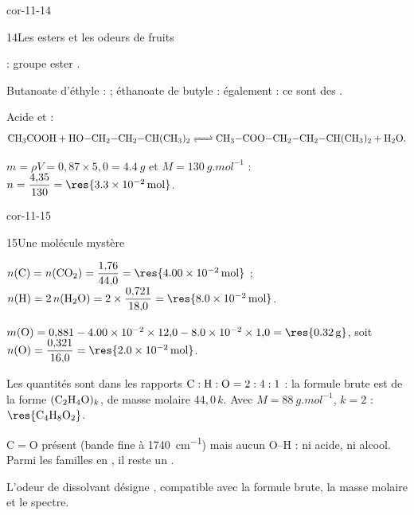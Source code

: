\begin{blocLivre}{cor-11-14}
\begin{corrige}{14}{Les esters et les odeurs de fruits}
\begin{questions}
\item {}\; : groupe ester .
\item Butanoate d'éthyle :  ; éthanoate de butyle  : 
également : ce sont des .
\item Acide  et  :
\[\ce{CH3COOH + HO-CH2-CH2-CH(CH3)2 <=> CH3-COO-CH2-CH2-CH(CH3)2 + H2O}.\]
\item $m=\rho V=0{,}87\times5{,}0=\qty{4,4}{g}$ et $M=\qty{130}{g.mol^{-1}}$ :
$n=\dfrac{4{,}35}{130}=\res{\qty{3,3e-2}{mol}}$.
\end{questions}
\end{corrige}
\end{blocLivre}
\begin{blocLivre}{cor-11-15}
\begin{corrige}{15}{Une molécule mystère}
\begin{questions}
\item $n(\ce{C})=n(\ce{CO2})=\dfrac{1{,}76}{44{,}0}=\res{\qty{4,00e-2}{mol}}$ ;
$n(\ce{H})=2\,n(\ce{H2O})=2\times\dfrac{0{,}721}{18{,}0}=\res{\qty{8,0e-2}{mol}}$.
\item $m(\ce{O})=0{,}881-\num{4.00e-2}\times12{,}0-\num{8.0e-2}\times1{,}0=\res{\qty{0,32}{g}}$, soit
$n(\ce{O})=\dfrac{0{,}321}{16{,}0}=\res{\qty{2,0e-2}{mol}}$.
\item Les quantités sont dans les rapports $\ce{C}:\ce{H}:\ce{O}=2:4:1$ : la formule brute est de la forme
$(\ce{C2H4O})_k$, de masse molaire $44{,}0\,k$. Avec $M=\qty{88}{g.mol^{-1}}$, $k=2$ :
$\res{\ce{C4H8O2}}$.
\item C$=$O présent (bande fine à \qty{1740}{cm^{-1}}) mais aucun O--H : ni acide, ni alcool. Parmi les familles en
, il reste un .
\item L'odeur de dissolvant désigne , compatible avec la
formule brute, la masse molaire et le spectre.
\end{questions}
\end{corrige}
\end{blocLivre}
